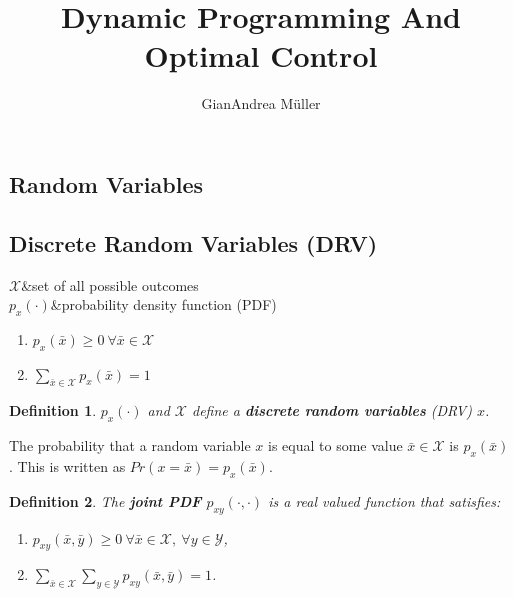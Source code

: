 \documentclass[10pt,a4paper]{scrartcl}
\title{Dynamic Programming And Optimal Control}
\author{GianAndrea Müller}
\newtheorem{define}{Definition}
\begin{document}
\begin{multicols*}{4}
\maketitle
\tableofcontents
\end{multicols*}

\begin{multicols*}{2}
\section{Random Variables}

\subsection{Discrete Random Variables (DRV)}

\begin{TDefinitionTable*}
$\mathcal{X}$&set of all possible outcomes\\
$p_x(\cdot)$&probability density function (PDF)\\
\end{TDefinitionTable*}

\begin{enumerate}
\item $p_x(\bar{x})\geq 0\ \forall\bar{x}\in\mathcal{X}$
\item $\sum\limits_{\bar{x}\in\mathcal{X}}p_x(\bar{x})=1$
\end{enumerate}

\begin{define}
$p_x(\cdot)$ and $\mathcal{X}$ define a \textbf{discrete random variables} (DRV) $x$.
\end{define}

The probability that a random variable $x$ is equal to some value $\bar{x}\in\mathcal{X}$ is $p_x(\bar{x})$. This is written as $Pr(x=\bar{x})=p_x(\bar{x})$.

\begin{define}
The \textbf{joint PDF} $p_{xy}(\cdot,\cdot)$ is a real valued function that satisfies:

\begin{enumerate}
\item $p_{xy}(\bar{x},\bar{y})\geq 0\ \forall\bar{x}\in\mathcal{X},\ \forall y\in\mathcal{Y}$,
\item $\sum\limits_{\bar{x}\in\mathcal{X}}\sum\limits_{y\in\mathcal{Y}}p_{xy}(\bar{x},\bar{y})=1$.
\end{enumerate}
\end{define}


\end{multicols*}
\end{document}
